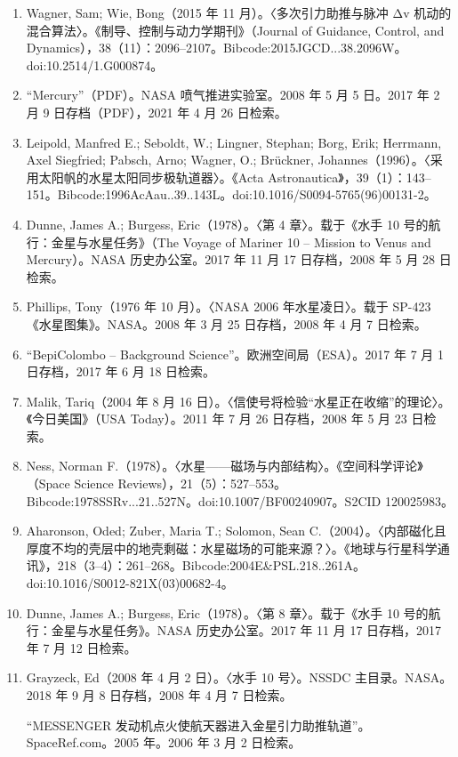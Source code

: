\begin{enumerate}
    \item Wagner, Sam; Wie, Bong（2015 年 11 月）。〈多次引力助推与脉冲 Δv 机动的混合算法〉。《制导、控制与动力学期刊》（Journal of Guidance, Control, and Dynamics），38（11）：2096–2107。Bibcode:2015JGCD...38.2096W。doi:10.2514/1.G000874。
    \item “Mercury”（PDF）。NASA 喷气推进实验室。2008 年 5 月 5 日。2017 年 2 月 9 日存档（PDF），2021 年 4 月 26 日检索。
    \item Leipold, Manfred E.; Seboldt, W.; Lingner, Stephan; Borg, Erik; Herrmann, Axel Siegfried; Pabsch, Arno; Wagner, O.; Brückner, Johannes（1996）。〈采用太阳帆的水星太阳同步极轨道器〉。《Acta Astronautica》，39（1）：143–151。Bibcode:1996AcAau..39..143L。doi:10.1016/S0094-5765(96)00131-2。
    \item Dunne, James A.; Burgess, Eric（1978）。〈第 4 章〉。载于《水手 10 号的航行：金星与水星任务》（The Voyage of Mariner 10 – Mission to Venus and Mercury）。NASA 历史办公室。2017 年 11 月 17 日存档，2008 年 5 月 28 日检索。
    \item Phillips, Tony（1976 年 10 月）。〈NASA 2006 年水星凌日〉。载于 SP-423《水星图集》。NASA。2008 年 3 月 25 日存档，2008 年 4 月 7 日检索。
    \item “BepiColombo – Background Science”。欧洲空间局（ESA）。2017 年 7 月 1 日存档，2017 年 6 月 18 日检索。
    \item Malik, Tariq（2004 年 8 月 16 日）。〈信使号将检验“水星正在收缩”的理论〉。《今日美国》（USA Today）。2011 年 7 月 26 日存档，2008 年 5 月 23 日检索。
    \item Ness, Norman F.（1978）。〈水星——磁场与内部结构〉。《空间科学评论》（Space Science Reviews），21（5）：527–553。Bibcode:1978SSRv...21..527N。doi:10.1007/BF00240907。S2CID 120025983。
    \item Aharonson, Oded; Zuber, Maria T.; Solomon, Sean C.（2004）。〈内部磁化且厚度不均的壳层中的地壳剩磁：水星磁场的可能来源？〉。《地球与行星科学通讯》，218（3–4）：261–268。Bibcode:2004E&PSL.218..261A。doi:10.1016/S0012-821X(03)00682-4。
    \item Dunne, James A.; Burgess, Eric（1978）。〈第 8 章〉。载于《水手 10 号的航行：金星与水星任务》。NASA 历史办公室。2017 年 11 月 17 日存档，2017 年 7 月 12 日检索。
    \item  Grayzeck, Ed（2008 年 4 月 2 日）。〈水手 10 号〉。NSSDC 主目录。NASA。2018 年 9 月 8 日存档，2008 年 4 月 7 日检索。

“MESSENGER 发动机点火使航天器进入金星引力助推轨道”。SpaceRef.com。2005 年。2006 年 3 月 2 日检索。


\end{enumerate}
